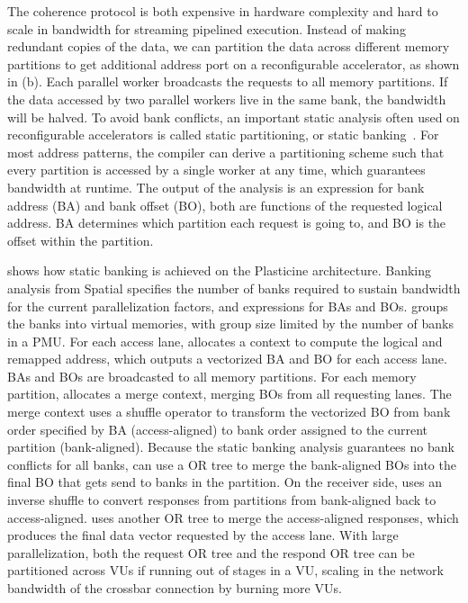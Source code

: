 The coherence protocol is both expensive in hardware complexity and hard to scale in bandwidth for
streaming pipelined execution.
Instead of making redundant copies of the data, we can partition the data across different memory
partitions to get additional address port on a reconfigurable accelerator, as shown in
 (b).
Each parallel worker broadcasts the requests to all memory partitions.
If the data accessed by two parallel workers live in the same bank, the bandwidth will be halved.
To avoid bank conflicts, an important static analysis often used on reconfigurable accelerators is called static partitioning, or static banking~\cite{poly_cong}.
For most address patterns, the compiler can derive a partitioning scheme such that every partition is accessed by a
single worker at any time, which guarantees bandwidth at runtime.
The output of the analysis is an expression for bank address (BA) and bank offset (BO), both are
functions of the requested logical address.
BA determines which partition each request is going to, and BO is the offset within the
partition.

 shows how static banking is achieved on the Plasticine architecture.
Banking analysis from Spatial specifies the number of banks required to sustain bandwidth for the
current parallelization factors, and expressions for BAs and BOs. 
\name groups the banks into virtual memories, with group size limited by the number of banks in a PMU.
For each access lane, \name allocates a context to compute the logical and remapped address, which
outputs a vectorized BA and BO for each access lane. BAs and BOs are broadcasted to all memory partitions.
For each memory partition, \name allocates a merge context, merging BOs from all requesting lanes.
The merge context uses a shuffle operator to transform the vectorized BO from bank order specified by BA
(access-aligned) to bank order assigned to the current partition (bank-aligned).
Because the static banking analysis guarantees no bank conflicts for all banks,
\name can use a OR tree to merge the bank-aligned BOs into the final BO that gets send to
banks in the partition. On the receiver side, \name uses an inverse shuffle to convert responses from
partitions from bank-aligned back to access-aligned.
\name uses another OR tree to merge the access-aligned responses, which produces the final data
vector requested by the access lane.
With large parallelization, both the request OR tree and the respond OR tree can be
partitioned across VUs if running out of stages in a VU, scaling in the network bandwidth of the
crossbar connection by burning more VUs.

